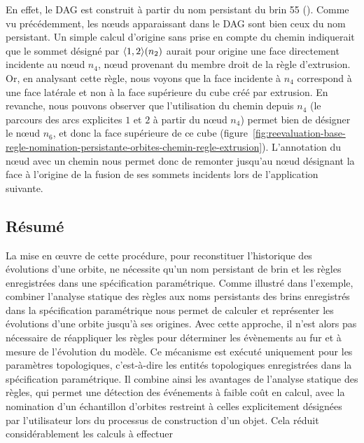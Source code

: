 En effet, le DAG est construit à partir du nom persistant du brin 55
().
Comme vu précédemment, les n\oe uds apparaissant dans le DAG sont bien ceux du
nom persistant. Un simple calcul d'origine sans prise en compte du chemin
indiquerait que le sommet désigné par \(\langle1,2\rangle(n_{2})\) aurait pour origine
une face directement incidente au n\oe ud \(n_{4}\), n\oe ud provenant du membre
droit de la règle d'extrusion. Or, en analysant cette règle, nous voyons que la
face incidente à \(n_{4}\) correspond à une face latérale et non à la face
supérieure du cube créé par extrusion. En revanche, nous pouvons observer que
l'utilisation du chemin depuis \(n_{4}\) (le parcours des arcs explicites \(1\)
et \(2\) à partir du n\oe ud \(n_{4}\)) permet bien de désigner le n\oe ud
\(n_{6}\), et donc la face supérieure de ce cube
(figure~\ref{fig:reevaluation-base-regle-nomination-persistante-orbites-chemin-regle-extrusion}).
L'annotation du n\oe ud avec un chemin nous permet donc de remonter jusqu'au
n\oe ud désignant la face à l'origine de la fusion de ses sommets incidents lors
de l'application suivante. %



\subsection{Résumé}



La mise en \oe uvre de cette procédure, pour reconstituer l'historique des
évolutions d'une orbite, ne nécessite qu'un nom persistant de brin et les règles
enregistrées dans une spécification paramétrique. %
Comme illustré
dans l'exemple, combiner l'analyse statique des règles aux noms persistants des brins enregistrés dans la spécification paramétrique nous permet de calculer et
représenter les évolutions d'une orbite jusqu'à ses origines. %
Avec cette approche, il n'est alors pas nécessaire de réappliquer les règles pour déterminer les évènements au fur et à mesure de l'évolution du modèle. %
Ce mécanisme est exécuté uniquement pour les paramètres topologiques,
c'est-à-dire les entités topologiques enregistrées dans la spécification
paramétrique.%
Il combine ainsi les avantages de l'analyse statique des règles, qui permet une détection des événements à faible coût en calcul, avec la nomination d'un échantillon d'orbites restreint à celles explicitement désignées par l'utilisateur lors du processus de construction d'un objet. Cela réduit considérablement les calculs à effectuer%

